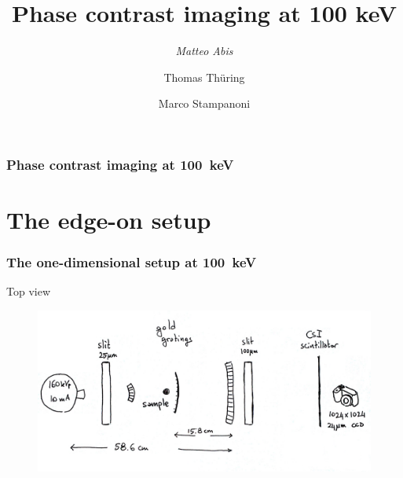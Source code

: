 \documentclass[first,firstsupp]{ETHclass}
\begin{document}
        \title[Second progress report]{Phase contrast imaging at 100 keV}
        \author{\emph{Matteo Abis} \and %
        Thomas Th\"uring \and %
        Marco Stampanoni}
    \renewcommand{\today}{28th May 2013}
    \setcounter{framenumber}{0}
    \begin{frame}
        \maketitle
    \end{frame}
    \setcounter{framenumber}{1}
    \begin{frame}
        \frametitle{Phase contrast imaging at \SI{100}{\kilo\electronvolt}}
        \tableofcontents
    \end{frame}
    \section{The edge-on setup}
    \setcounter{framenumber}{1}
    \begin{frame}
        \frametitle{The one-dimensional setup at \SI{100}{\kilo\electronvolt}}
        Top view
        \begin{figure}[h]
            \centering
            \includegraphics[width=\textwidth]{setup.pdf}
        \end{figure}
    \end{frame}
\end{document}
